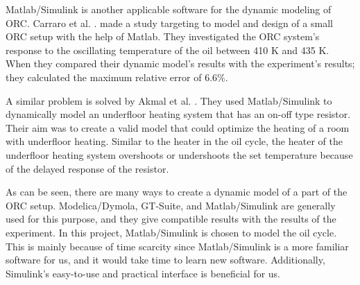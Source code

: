 Matlab/Simulink is another applicable software for the dynamic modeling of ORC. Carraro et al. \cite{carr}. made a study targeting to model and design of a small ORC setup with the help of Matlab. They investigated the ORC system's response to the oscillating temperature of the oil between 410 K and 435 K. When they compared their dynamic model's results with the experiment's results; they calculated the maximum relative error of 6.6\%.

A similar problem is solved by Akmal et al. \cite{inproceedings}. They used Matlab/Simulink to dynamically model an underfloor heating system that has an on-off type resistor. Their aim was to create a valid model that could optimize the heating of a room with underfloor heating. Similar to the heater in the oil cycle, the heater of the underfloor heating system overshoots or undershoots the set temperature because of the delayed response of the resistor.
	
As can be seen, there are many ways to create a dynamic model of a part of the ORC setup. Modelica/Dymola, GT-Suite, and Matlab/Simulink are generally used for this purpose, and they give compatible results with the results of the experiment. In this project, Matlab/Simulink is chosen to model the oil cycle. This is mainly because of time scarcity since Matlab/Simulink is a more familiar software for us, and it would take time to learn new software. Additionally, Simulink's easy-to-use and practical interface is beneficial for us.